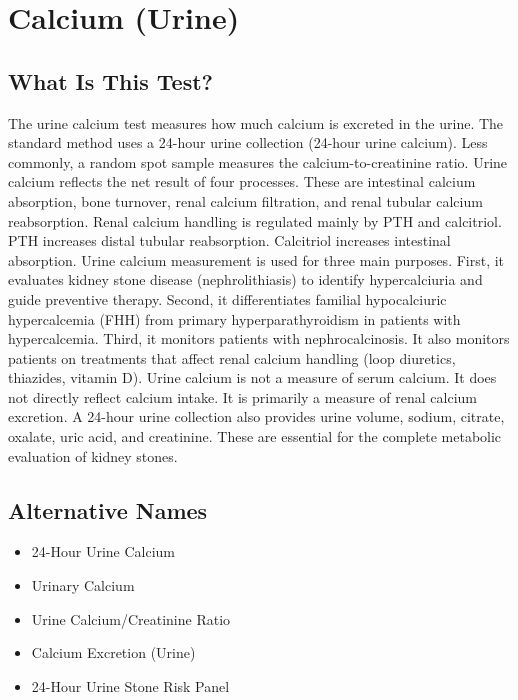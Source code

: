 \chapter{Calcium (Urine)}

\section*{What Is This Test?}
The urine calcium test measures how much calcium is excreted in the urine. The standard method uses a 24-hour urine collection (24-hour urine calcium). Less commonly, a random spot sample measures the calcium-to-creatinine ratio. Urine calcium reflects the net result of four processes. These are intestinal calcium absorption, bone turnover, renal calcium filtration, and renal tubular calcium reabsorption. Renal calcium handling is regulated mainly by PTH and calcitriol. PTH increases distal tubular reabsorption. Calcitriol increases intestinal absorption. Urine calcium measurement is used for three main purposes. First, it evaluates kidney stone disease (nephrolithiasis) to identify hypercalciuria and guide preventive therapy. Second, it differentiates familial hypocalciuric hypercalcemia (FHH) from primary hyperparathyroidism in patients with hypercalcemia. Third, it monitors patients with nephrocalcinosis. It also monitors patients on treatments that affect renal calcium handling (loop diuretics, thiazides, vitamin D). Urine calcium is not a measure of serum calcium. It does not directly reflect calcium intake. It is primarily a measure of renal calcium excretion. A 24-hour urine collection also provides urine volume, sodium, citrate, oxalate, uric acid, and creatinine. These are essential for the complete metabolic evaluation of kidney stones.

\section*{Alternative Names}
\begin{itemize}
  \item 24-Hour Urine Calcium
  \item Urinary Calcium
  \item Urine Calcium/Creatinine Ratio
  \item Calcium Excretion (Urine)
  \item 24-Hour Urine Stone Risk Panel
\end{itemize}
